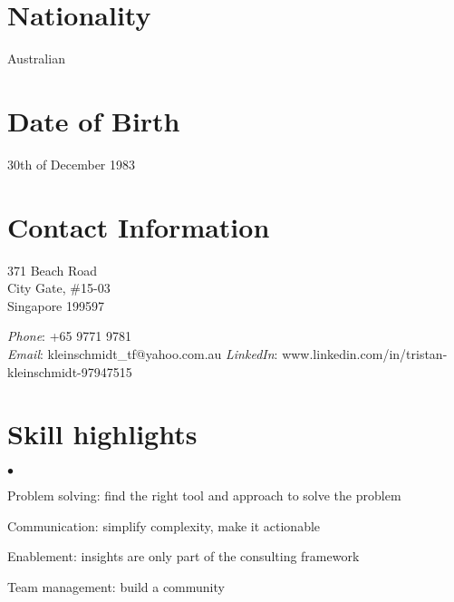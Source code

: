 \documentclass[margin,line]{resume}
\newenvironment{list2}{
  \begin{list}{$\bullet$}{%
      \setlength{\itemsep}{0in}
      \setlength{\parsep}{0in} \setlength{\parskip}{0in}
      \setlength{\topsep}{0in} \setlength{\partopsep}{0in}
      \setlength{\leftmargin}{0.2in}}}{\end{list}}
\begin{document}
\begin{resume}

\section{\sc Nationality}
Australian

\section{\sc Date of Birth}
30th of December 1983

\section{\sc Contact Information}

\parbox[t]{3.3in}{%
371 Beach Road\\
City Gate, \#15-03\\
Singapore 199597}
\parbox[t]{2.3in}{%
{\it Phone}: {+65 9771 9781}  \\
{\it Email}: {kleinschmidt\_tf@yahoo.com.au}
{\it LinkedIn}: {www.linkedin.com/in/tristan-kleinschmidt-97947515}
}


\section{\sc Skill highlights}
\begin{list2}
\item Problem solving: find the right tool and approach to solve the problem
\item Communication: simplify complexity, make it actionable
\item Enablement: insights are only part of the consulting framework
\item Team management: build a community
\end{list2}


\end{resume}
\end{document}
